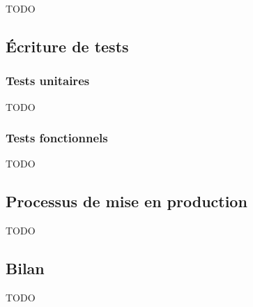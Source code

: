 TODO








\subsection{Écriture de tests}

\subsubsection{Tests unitaires}

TODO

\subsubsection{Tests fonctionnels}

TODO

\subsection{Processus de mise en production}

TODO

\subsection{Bilan}

TODO
